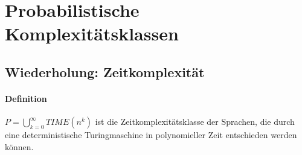 \section{Probabilistische Komplexitätsklassen}


\subsection{Wiederholung: Zeitkomplexität}




\paragraph{Definition}
$P = \bigcup\limits_{k=0}^{\infty} TIME(n^k)$ ist die Zeitkomplexitätsklasse der Sprachen, die durch eine deterministische Turingmaschine in polynomieller Zeit entschieden werden können.


